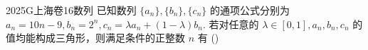 
\begin{problem}{2025}{G}{上海卷}{16}{数列}
已知数列 $\{a_n\}, \{b_n\}, \{c_n\}$ 的通项公式分别为 $a_n=10n-9, b_n=2^n, c_n=\lambda a_n + (1-\lambda)b_n$. 若对任意的 $\lambda \in [0,1], a_n, b_n, c_n$ 的值均能构成三角形，则满足条件的正整数 $n$ 有
(\hspace{1cm})
\begin{choices}
\end{choices}
\end{problem}